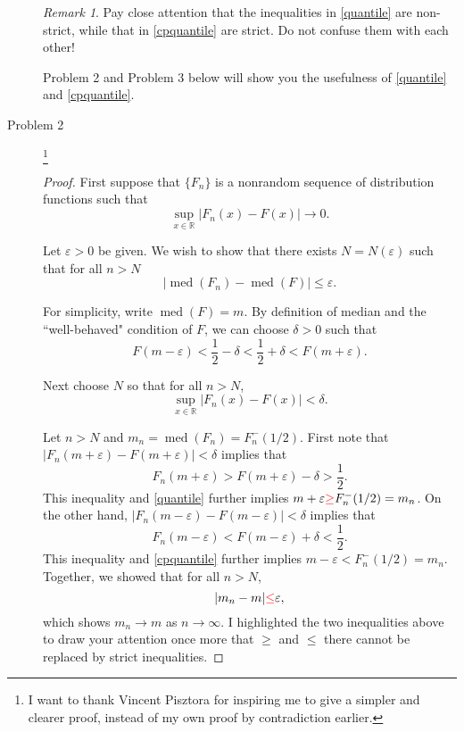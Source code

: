 \documentclass{article}
\newcommand{\eps}{\varepsilon}
\newcommand{\real}{\mathbb{R}}
\DeclareMathOperator*{\med}{med}
\theoremstyle{definition}
\theoremstyle{plain}
\theoremstyle{remark}
\newtheorem*{rem}{Remark}
\begin{document}
\begin{description}
\begin{rem}
Pay close attention that the inequalities in \eqref{quantile} are non-strict, 
while that in \eqref{cpquantile} are strict. Do not confuse them with each other!

Problem 2 and Problem 3 below will show you the usefulness of \eqref{quantile}
and \eqref{cpquantile}.
\end{rem}

\item[Problem 2]\footnote{I want to thank Vincent Pisztora for inspiring me to give a 
simpler and clearer proof, instead of my own proof by contradiction earlier.}
\begin{proof}
First suppose that $\{F_n\}$ is a nonrandom sequence of distribution functions such that
\begin{equation}\label{gc0}
\sup_{x \in \real} |F_n(x) - F(x)| \to 0.
\end{equation}

Let $\eps > 0$ be given. We wish to show that there exists $N = N(\eps)$ such that for all $n > N$
$$|\med(F_n) - \med(F)| \leq \eps.$$

For simplicity, write $\med(F) = m$. By definition of median and the ``well-behaved" condition of 
$F$, we can choose $\delta > 0$ such that
\begin{equation}\label{fact}
F(m - \eps) < \frac{1}{2} - \delta < \frac{1}{2} + \delta < F(m + \eps).
\end{equation}

Next choose $N$ so that for all $n > N$,
\begin{equation*}
\sup_{x \in \real} |F_n(x) - F(x)| < \delta.
\end{equation*}

Let $n > N$ and $m_n = \med(F_n) = F_n^{-}(1/2)$. First note that $|F_n(m + \eps) - 
F(m + \eps)| < \delta$ implies that 
\begin{equation*}
    F_n(m + \eps) > F(m + \eps) - \delta > \frac{1}{2}.
\end{equation*}
This inequality and \eqref{quantile} further implies $m + \eps {\color{red}{\geq}} 
F_n^{-}(1/2) = m_n$. On the other hand, $|F_n(m - \eps) - F(m - \eps)| < \delta$ 
implies that
\begin{equation*}
    F_n(m - \eps) < F(m - \eps) + \delta < \frac{1}{2}.
\end{equation*}
This inequality and \eqref{cpquantile} further implies $m - \eps < F_n^{-}(1/2) = m_n$.
Together, we showed that for all $n > N$, 
\begin{equation}\label{temp1}
    |m_n - m| {\color{red}{\leq}} \eps,
\end{equation}
which shows $m_n \to m$ as $n \to \infty$. I highlighted the two inequalities above to
draw your attention once more that $\geq$ and $\leq$ there cannot be replaced by strict
inequalities. 


\end{proof}
\end{description}
\end{document}
